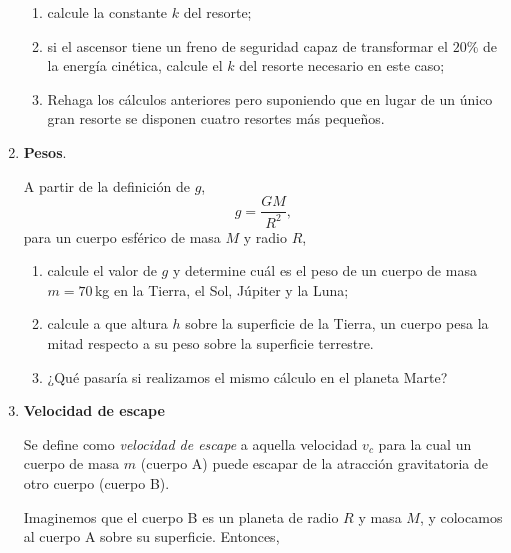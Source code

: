 \documentclass[a4paper,12pt]{article}
\begin{document}
\begin{enumerate}
\begin{enumerate}
\item calcule la constante $k$ del resorte;
\item si el ascensor tiene un freno de seguridad capaz de transformar el $20\%$ de
la energía cinética, calcule el $k$ del resorte necesario en este caso;
\item Rehaga los cálculos anteriores pero suponiendo que en lugar de un único
gran resorte se disponen cuatro resortes más pequeños. 
\end{enumerate}

\item {\bf{Pesos}}.

A partir de la definición de $g$, 
\[
g=\frac{GM}{R^2},
\]
para un cuerpo esférico de masa $M$ y radio $R$, 
\begin{enumerate}
\item calcule el valor de $g$ y determine cuál es el peso de un cuerpo de masa
$m=70$\,kg en la Tierra, el Sol, Júpiter y la Luna; 
\item calcule a que altura $h$ sobre la superficie de la Tierra, un cuerpo pesa la mitad respecto a su peso sobre la superficie terrestre. 
\item ¿Qué pasaría si realizamos el mismo cálculo en el planeta Marte?
\end{enumerate}

\item {\bf{Velocidad de escape}}

Se define como {\emph{velocidad de escape}} a aquella velocidad $v_c$ para la
cual un cuerpo de masa $m$ (cuerpo A) puede escapar de la atracción gravitatoria
de otro cuerpo (cuerpo B).

Imaginemos que el cuerpo B es un planeta de radio $R$ y masa $M$, y colocamos al
cuerpo A sobre su superficie. Entonces,
 

\end{enumerate}
\end{document}
